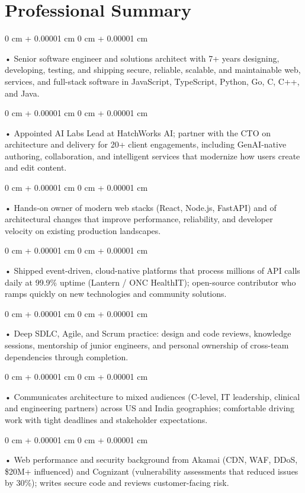 \documentclass[10pt, letterpaper]{article}
\newenvironment{onecolentry}{
    \begin{adjustwidth}{
        0 cm + 0.00001 cm
    }{
        0 cm + 0.00001 cm
    }
}{
    \end{adjustwidth}
} %
\begin{document}
    \section{Professional Summary}
        \vspace{2 pt }
        \begin{onecolentry}
            • Senior software engineer and solutions architect with 7+ years designing, developing, testing, and shipping secure, reliable, scalable, and maintainable web, services, and full-stack software in JavaScript, TypeScript, Python, Go, C, C++, and Java.
        \end{onecolentry}
        \begin{onecolentry}
            • Appointed AI Labs Lead at HatchWorks AI; partner with the CTO on architecture and delivery for 20+ client engagements, including GenAI-native authoring, collaboration, and intelligent services that modernize how users create and edit content.
        \end{onecolentry}
        \begin{onecolentry}
            • Hands-on owner of modern web stacks (React, Node.js, FastAPI) and of architectural changes that improve performance, reliability, and developer velocity on existing production landscapes.
        \end{onecolentry}
        \begin{onecolentry}
            • Shipped event-driven, cloud-native platforms that process millions of API calls daily at 99.9\% uptime (Lantern / ONC HealthIT); open-source contributor who ramps quickly on new technologies and community solutions.
        \end{onecolentry}
        \begin{onecolentry}
            • Deep SDLC, Agile, and Scrum practice: design and code reviews, knowledge sessions, mentorship of junior engineers, and personal ownership of cross-team dependencies through completion.
        \end{onecolentry}
        \begin{onecolentry}
            • Communicates architecture to mixed audiences (C-level, IT leadership, clinical and engineering partners) across US and India geographies; comfortable driving work with tight deadlines and stakeholder expectations.
        \end{onecolentry}
        \begin{onecolentry}
            • Web performance and security background from Akamai (CDN, WAF, DDoS, \$20M+ influenced) and Cognizant (vulnerability assessments that reduced issues by 30\%); writes secure code and reviews customer-facing risk.
        \end{onecolentry}
\end{document}
